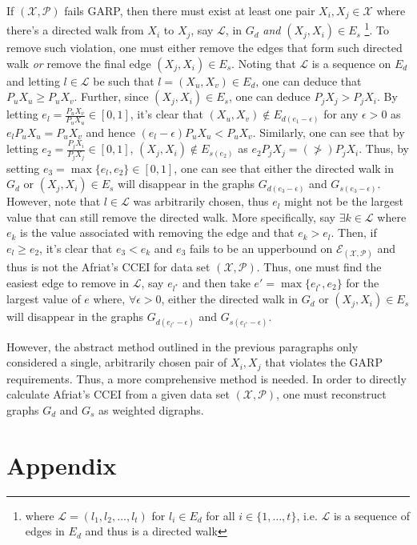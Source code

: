 \documentclass{article} %
\theoremstyle{style1}
\theoremstyle{example}
\begin{document}
If $(\mathcal{X},\mathcal{P})$ fails GARP, then there must exist at least one pair $X_i,X_j\in\mathcal{X}$ where there's a directed walk from $X_i$ to $X_j$, say $\mathcal{L}$, in $G_d$ \emph{and} $(X_j,X_i)\in E_s$ \footnote{where $\mathcal{L}=(l_1,l_2, \ldots, l_t)$ for $l_i\in E_d$ for all $i\in\{1,\ldots,t\}$, i.e. $\mathcal{L}$ is a sequence of edges in $E_d$ and thus is a directed walk}. To remove such violation, one must either remove the edges that form such directed walk \emph{or} remove the final edge $(X_j,X_i)\in E_s$. Noting that $\mathcal{L}$ is a sequence on $E_d$ and letting $l\in\mathcal{L}$ be such that $l=(X_u,X_v)\in E_d$, one can deduce that $P_uX_u\geq P_uX_v$. Further, since $(X_j,X_i)\in E_s$, one can deduce $P_jX_j>P_jX_i$. By letting $e_l=\frac{P_u X_v}{P_uX_u}\in[0,1]$, it's clear that $(X_u,X_v)\not\in E_{d(e_1-\epsilon)}$ for any $\epsilon>0$ as $e_lP_uX_u= P_uX_v$ and hence $(e_l-\epsilon) P_uX_u< P_uX_v$. Similarly, one can see that by letting $e_2=\frac{P_jX_i}{P_jX_j}\in[0,1]$, $(X_j,X_i)\not\in E_{s(e_2)}$ as $e_2 P_jX_j= (\not>) P_jX_i$. Thus, by setting $e_3 = \max\{e_l,e_2\}\in[0,1]$, one can see that either the directed walk in $G_d$ or $(X_j,X_i)\in E_s$ will disappear in the graphs $G_{d(e_3-\epsilon)}$ and $G_{s(e_3-\epsilon)}$. However, note that $l\in\mathcal{L}$ was arbitrarily chosen, thus $e_l$ might not be the largest value that can still remove the directed walk. More specifically, say $\exists k\in\mathcal{L}$ where $e_k$ is the value associated with removing the edge and that $e_k > e_l$. Then, if $e_l \geq e_2$, it's clear that $e_3 < e_k$ and $e_3$ fails to be an upperbound on $\mathcal{E}_{(\mathcal{X},\mathcal{P})}$ and thus is not the Afriat's CCEI for data set $(\mathcal{X},\mathcal{P})$. Thus, one must find the easiest edge to remove in $\mathcal{L}$, say $e_{l^*}$ and then take $e' = \max\{e_{l^*},e_2\}$ for the largest value of $e$ where, $\forall \epsilon>0$, either the directed walk in $G_d$ or $(X_j,X_i)\in E_s$ will disappear in the graphs $G_{d(e_{l^*}-\epsilon)}$ and $G_{s(e_{l^*}-\epsilon)}$. 

However, the abstract method outlined in the previous paragraphs only considered a single, arbitrarily chosen pair of $X_i,X_j$ that violates the GARP requirements. Thus, a more comprehensive method is needed. In order to directly calculate Afriat's CCEI from a given data set $(\mathcal{X},\mathcal{P})$, one must reconstruct graphs $G_d$ and $G_s$ as weighted digraphs. 
\section{Appendix}
\WGARP*
\end{document}
